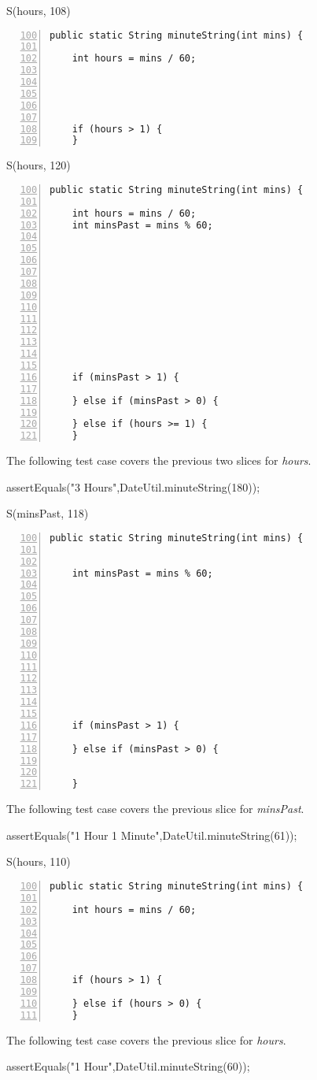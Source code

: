 \documentclass[fontsize=12pt,paper=letter,twoside]{scrartcl}
\begin{document}
\break
S(hours, 108)
\begin{lstlisting}[numbers=left,firstnumber=100]
  public static String minuteString(int mins) {
    
    int hours = mins / 60;
    
    


    
    if (hours > 1) {
    }
\end{lstlisting}


S(hours, 120)
\begin{lstlisting}[numbers=left,firstnumber=100]
  public static String minuteString(int mins) {
    
    int hours = mins / 60;
    int minsPast = mins % 60;
    
    
    
    
    
     
    
     
    
     
    

    if (minsPast > 1) {
      
    } else if (minsPast > 0) {
      
    } else if (hours >= 1) {
    }
\end{lstlisting}
The following test case covers the previous two slices for \emph{hours}.
\begin{code}
assertEquals("3 Hours",DateUtil.minuteString(180));
\end{code}

S(minsPast, 118)
\begin{lstlisting}[numbers=left,firstnumber=100]
  public static String minuteString(int mins) {
    
    
    int minsPast = mins % 60;
    
    
    
    
    
     
    
     
    
     
    

    if (minsPast > 1) {
      
    } else if (minsPast > 0) {
      
    
    }
\end{lstlisting}
The following test case covers the previous slice for \emph{minsPast}.
\begin{code}
assertEquals("1 Hour 1 Minute",DateUtil.minuteString(61));
\end{code}

S(hours, 110)
\begin{lstlisting}[numbers=left,firstnumber=100]
  public static String minuteString(int mins) {
    
    int hours = mins / 60;
    
    
    
    
    
    if (hours > 1) {
      
    } else if (hours > 0) {
    }
\end{lstlisting}
The following test case covers the previous slice for \emph{hours}.
\begin{code}
assertEquals("1 Hour",DateUtil.minuteString(60));
\end{code}
\end{document}
